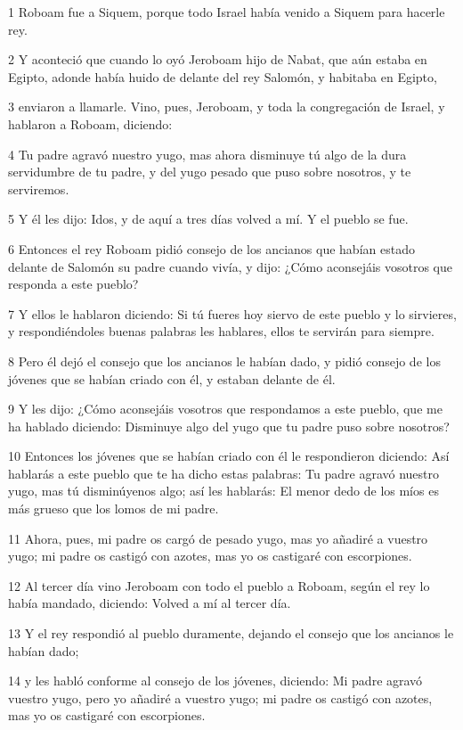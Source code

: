 \par 1 Roboam fue a Siquem, porque todo Israel había venido a Siquem para hacerle rey. 
\par 2 Y aconteció que cuando lo oyó Jeroboam hijo de Nabat, que aún estaba en Egipto, adonde había huido de delante del rey Salomón, y habitaba en Egipto,
\par 3 enviaron a llamarle. Vino, pues, Jeroboam, y toda la congregación de Israel, y hablaron a Roboam, diciendo:
\par 4 Tu padre agravó nuestro yugo, mas ahora disminuye tú algo de la dura servidumbre de tu padre, y del yugo pesado que puso sobre nosotros, y te serviremos.
\par 5 Y él les dijo: Idos, y de aquí a tres días volved a mí. Y el pueblo se fue.
\par 6 Entonces el rey Roboam pidió consejo de los ancianos que habían estado delante de Salomón su padre cuando vivía, y dijo: ¿Cómo aconsejáis vosotros que responda a este pueblo?
\par 7 Y ellos le hablaron diciendo: Si tú fueres hoy siervo de este pueblo y lo sirvieres, y respondiéndoles buenas palabras les hablares, ellos te servirán para siempre.
\par 8 Pero él dejó el consejo que los ancianos le habían dado, y pidió consejo de los jóvenes que se habían criado con él, y estaban delante de él.
\par 9 Y les dijo: ¿Cómo aconsejáis vosotros que respondamos a este pueblo, que me ha hablado diciendo: Disminuye algo del yugo que tu padre puso sobre nosotros?
\par 10 Entonces los jóvenes que se habían criado con él le respondieron diciendo: Así hablarás a este pueblo que te ha dicho estas palabras: Tu padre agravó nuestro yugo, mas tú disminúyenos algo; así les hablarás: El menor dedo de los míos es más grueso que los lomos de mi padre.
\par 11 Ahora, pues, mi padre os cargó de pesado yugo, mas yo añadiré a vuestro yugo; mi padre os castigó con azotes, mas yo os castigaré con escorpiones.
\par 12 Al tercer día vino Jeroboam con todo el pueblo a Roboam, según el rey lo había mandado, diciendo: Volved a mí al tercer día.
\par 13 Y el rey respondió al pueblo duramente, dejando el consejo que los ancianos le habían dado;
\par 14 y les habló conforme al consejo de los jóvenes, diciendo: Mi padre agravó vuestro yugo, pero yo añadiré a vuestro yugo; mi padre os castigó con azotes, mas yo os castigaré con escorpiones.
